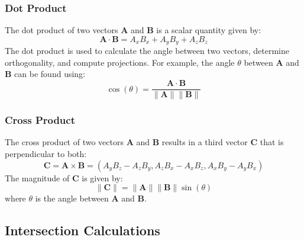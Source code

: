 \documentclass[12pt]{article}
\begin{document}
\subsubsection{Dot Product}
The dot product of two vectors \(\mathbf{A}\) and \(\mathbf{B}\) is a scalar quantity given by:
\[
    \mathbf{A} \cdot \mathbf{B} = A_x B_x + A_y B_y + A_z B_z
\]
The dot product is used to calculate the angle between two vectors, determine orthogonality, and compute projections. For example, the angle \(\theta\) between \(\mathbf{A}\) and \(\mathbf{B}\) can be found using:
\[
    \cos(\theta) = \frac{\mathbf{A} \cdot \mathbf{B}}{\|\mathbf{A}\| \|\mathbf{B}\|}
\]

\subsubsection{Cross Product}
The cross product of two vectors \(\mathbf{A}\) and \(\mathbf{B}\) results in a third vector \(\mathbf{C}\) that is perpendicular to both:
\[
    \mathbf{C} = \mathbf{A} \times \mathbf{B} = \left( A_y B_z - A_z B_y, A_z B_x - A_x B_z, A_x B_y - A_y B_x \right)
\]
The magnitude of \(\mathbf{C}\) is given by:
\[
    \|\mathbf{C}\| = \|\mathbf{A}\| \|\mathbf{B}\| \sin(\theta)
\]
where \(\theta\) is the angle between \(\mathbf{A}\) and \(\mathbf{B}\).

\subsection{Intersection Calculations}
\end{document}
